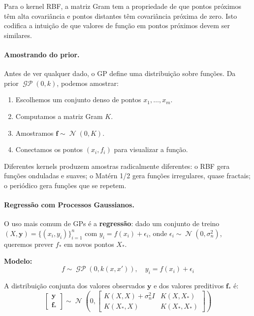 \documentclass{tufte-handout}
\DeclareMathOperator{\N}{\mathcal{N}}
\DeclareMathOperator{\GP}{\mathcal{GP}}
\begin{document}
Para o kernel RBF, a matriz Gram tem a propriedade de que pontos próximos têm alta covariância e pontos distantes têm covariância próxima de zero. Isto codifica a intuição de que valores de função em pontos próximos devem ser similares.

\paragraph{Amostrando do prior.}

Antes de ver qualquer dado, o GP define uma distribuição sobre funções. Da prior $\GP(0, k)$, podemos amostrar:

\begin{enumerate}
    \item Escolhemos um conjunto denso de pontos $x_1, \dots, x_m$.
    \item Computamos a matriz Gram $K$.
    \item Amostramos $\mathbf{f} \sim \N(0, K)$.
    \item Conectamos os pontos $(x_i, f_i)$ para visualizar a função.
\end{enumerate}

Diferentes kernels produzem amostras radicalmente diferentes: o RBF gera funções onduladas e suaves; o Matérn 1/2 gera funções irregulares, quase fractais; o periódico gera funções que se repetem.

\paragraph{Regressão com Processos Gaussianos.}

O uso mais comum de GPs é a \textbf{regressão}: dado um conjunto de treino $(X, \mathbf{y}) = \{(x_i, y_i)\}_{i=1}^n$ com $y_i = f(x_i) + \epsilon_i$, onde $\epsilon_i \sim \N(0, \sigma_n^2)$, queremos prever $f_*$ em novos pontos $X_*$.

\textbf{Modelo:}
\[
f \sim \GP(0, k(x, x')), \quad y_i = f(x_i) + \epsilon_i
\]

A distribuição conjunta dos valores observados $\mathbf{y}$ e dos valores preditivos $\mathbf{f}_*$ é:
\[
\begin{bmatrix}
\mathbf{y} \\
\mathbf{f}_*
\end{bmatrix}
\sim \N\!\left(
0,
\begin{bmatrix}
K(X, X) + \sigma_n^2 I & K(X, X_*) \\
K(X_*, X) & K(X_*, X_*)
\end{bmatrix}
\right)
\]
\end{document}
